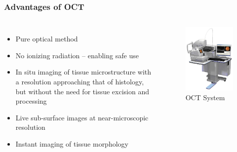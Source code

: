 \begin{frame}
    \frametitle{Advantages of OCT}

    \begin{columns}[T]

        \begin{itemize}
            \item Pure optical method
            \item No ionizing radiation – enabling safe use
            \item In situ imaging of tissue microstructure with a resolution approaching that of histology, but without the need for tissue excision and processing
            \item Live sub-surface images at near-microscopic resolution
            \item Instant imaging of tissue morphology
        \end{itemize}


        \begin{figure}
            \includegraphics[height=0.7\textheight]{figures/OCTSystem.png}
            \caption{OCT System}
        \end{figure}
    \end{columns}

\end{frame}




